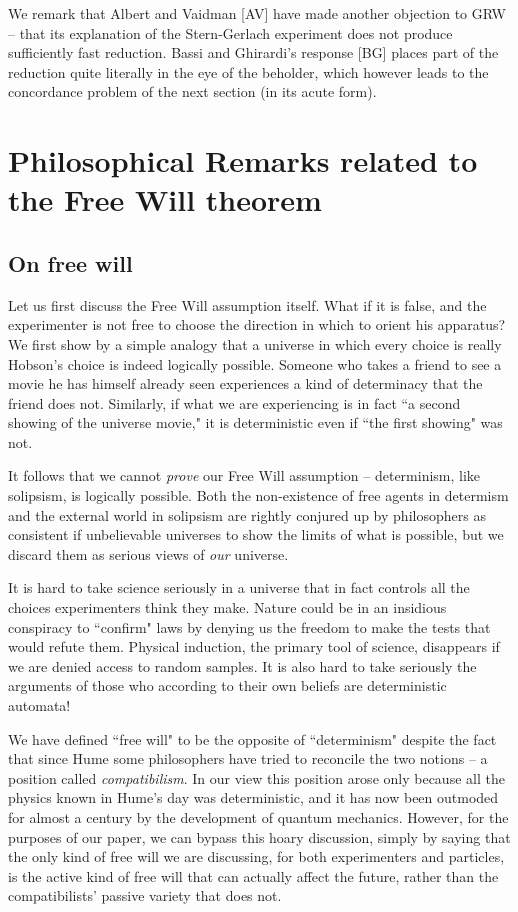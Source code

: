 \documentclass[12pt]{amsart}
\begin{document}
We remark that Albert and Vaidman [AV] have made another objection to GRW -- that its explanation of the Stern-Gerlach experiment does not produce sufficiently fast reduction. Bassi and Ghirardi's response [BG] places part of the reduction quite literally in the eye 
of the beholder, which however leads to the concordance problem of the next section (in its
acute form).
 
\renewcommand{\thefootnote}{\fnsymbol{footnote}}

\section{Philosophical Remarks related to the Free Will theorem}

\subsection {On free will}
Let us first discuss the Free Will assumption itself.  What if it is false, and the experimenter is not free to choose the direction in which to orient his apparatus?
We first show by a simple analogy that a universe in which every choice is really Hobson's choice is indeed logically possible. Someone who takes a friend to see a movie he has himself already seen experiences a kind of determinacy that the friend does not. 
Similarly, if what we are experiencing is in fact ``a second showing of the universe movie," it is deterministic even if ``the first showing" was not.

It follows that we cannot {\em prove} our Free Will assumption -- determinism, like solipsism, is logically possible.  Both the non-existence of free agents in determism and the external world in solipsism are rightly conjured up by philosophers as consistent if unbelievable universes to show the limits of what is possible, but we discard them as serious views of {\em our} universe.

It is hard to take science seriously in a universe that in fact controls all the
choices experimenters think they make.  Nature could be in an insidious conspiracy to ``confirm" laws by denying us the freedom to make the tests that would refute them.
Physical induction, the primary tool of science, disappears if we are denied access to random samples.  It is also hard to take seriously the arguments of those who according to their own beliefs are deterministic automata!

We have defined ``free will" to be the opposite of ``determinism" despite the fact that since Hume some philosophers have tried to reconcile the two notions -- a position called {\em compatibilism}.  In our view this position arose only because all the physics known in Hume's day was deterministic, and it has now been outmoded for almost a century by the development of quantum mechanics. However, for the purposes of our paper, we can bypass this hoary discussion, simply by saying that the only kind of free will we are discussing, for both experimenters and particles, is the active kind of free will that can actually affect the future, rather than the compatibilists' passive variety that does not. 
\end{document}

